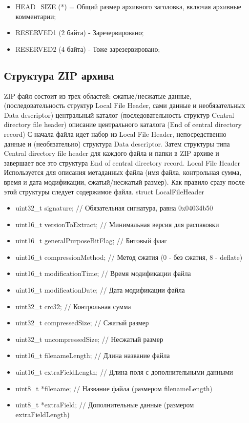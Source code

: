 \begin{itemize}
\item HEAD_SIZE (*) = Общий размер архивного заголовка, включая архивные комментарии;
\item RESERVED1 (2 байта) - Зарезервировано;
\item RESERVED2 (4 байта) - Тоже зарезервировано;
\end{itemize}

\subsection{Структура ZIP архива}                

ZIP файл состоит из трех областей:
сжатые/несжатые данные, (последовательность структур Local File Header, сами данные и необязательных Data descriptor)
центральный каталог (последовательность структур Central directory file header)
описание центрального каталога (End of central directory record)
С начала файла идет набор из Local File Header, непосредственно данные и (необязательно) структура Data descriptor. Затем структуры типа Central directory file header для каждого файла и папки в ZIP архиве и завершает все это структура End of central directory record.
Local File Header
Используется для описания метаданных файла (имя файла, контрольная сумма, время и дата модификации, сжатый/несжатый размер). Как правило сразу после этой структуры следует содержимое файла.
struct LocalFileHeader
\begin{itemize}
    \item uint32_t signature;	// Обязательная сигнатура, равна 0x04034b50
    \item uint16_t versionToExtract;	// Минимальная версия для распаковки
    \item uint16_t generalPurposeBitFlag;	// Битовый флаг
    \item uint16_t compressionMethod;	// Метод сжатия (0 - без сжатия, 8 - deflate)
    \item uint16_t modificationTime;	// Время модификации файла
    \item uint16_t modificationDate;	// Дата модификации файла
    \item uint32_t crc32;				// Контрольная сумма
    \item uint32_t compressedSize;	// Сжатый размер
    \item uint32_t uncompressedSize;	// Несжатый размер
    \item uint16_t filenameLength;	// Длина название файла
    \item uint16_t extraFieldLength;	// Длина поля с дополнительными данными
    \item uint8_t *filename;			// Название файла (размером filenameLength)
    \item uint8_t *extraField;		// Дополнительные данные (размером extraFieldLength)
\end{itemize}
